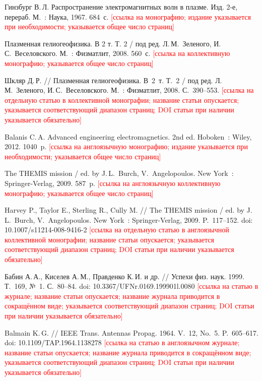 \documentclass[12pt, a4paper]{article}
\begin{document}
\begin{thebibliography}{99}

Гинзбург В.\,Л. Распространение электромагнитных волн в плазме. Изд. 2-е, перераб. М.~: Наука, 1967. 684~с.
\textcolor{red}{[ссылка на монографию; издание указывается при необходимости; указывается общее число страниц]}

Плазменная гелиогеофизика. В 2 т. Т. 2 / под ред. Л.\,М.~Зеленого, И.\,С.~Веселовского. М.~: Физматлит, 2008. 560~с.
\textcolor{red}{[ссылка на коллективную монографию; указывается общее число страниц]}

Шкляр Д.\,Р. // Плазменная гелиогеофизика. В~2~т. Т.~2 / под ред. Л.\,М.~Зеленого, И.\,С.~Веселовского. М.~: Физматлит, 2008. С.~390--553.
\textcolor{red}{[ссылка на отдельную статью в коллективной монографии; название статьи опускается; указывается соответствующий диапазон страниц; DOI статьи при наличии указывается обязательно]}

Balanis C.\,A. Advanced engineering electromagnetics. 2nd ed. Hoboken~: Wiley, 2012. 1040~p.
\textcolor{red}{[ссылка на англоязычную монографию; издание указывается при необходимости; указывается общее число страниц]}

The THEMIS mission / ed. by J.\,L.~Burch, V.~Angelopoulos. New York~: Springer-Verlag, 2009. 587~p.
\textcolor{red}{[ссылка на англоязычную коллективную монографию; указывается общее число страниц]}

Harvey P., Taylor E., Sterling R., Cully M. // The THEMIS mission / ed. by J.\,L.~Burch, V.~Angelopoulos. New York~: Springer-Verlag, 2009. P.~117--152. doi: 10.1007/s11214-008-9416-2
\textcolor{red}{[ссылка на отдельную статью в англоязычной коллективной монографии; название статьи опускается; указывается соответствующий диапазон страниц; DOI статьи при наличии указывается обязательно]}

Бабин А.\,А., Киселев А.\,М., Правденко К.\,И. и др. // Успехи физ. наук. 1999. Т.~169, №~1. С.~80--84. doi: 10.3367/UFNr.0169.199901l.0080
\textcolor{red}{[ссылка на статью в журнале; название статьи опускается; название журнала приводится в сокращённом виде; указывается соответствующий диапазон страниц; DOI статьи при наличии указывается обязательно]}

Balmain K.\,G. // IEEE Trans. Antennas Propag. 1964. V.~12, No.~5. P.~605--617. doi: 10.1109/TAP.1964.1138278
\textcolor{red}{[ссылка на статью в англоязычном журнале; название статьи опускается; название журнала приводится в сокращённом виде; указывается соответствующий диапазон страниц; DOI статьи при наличии указывается обязательно]}


\end{thebibliography}
\end{document}
